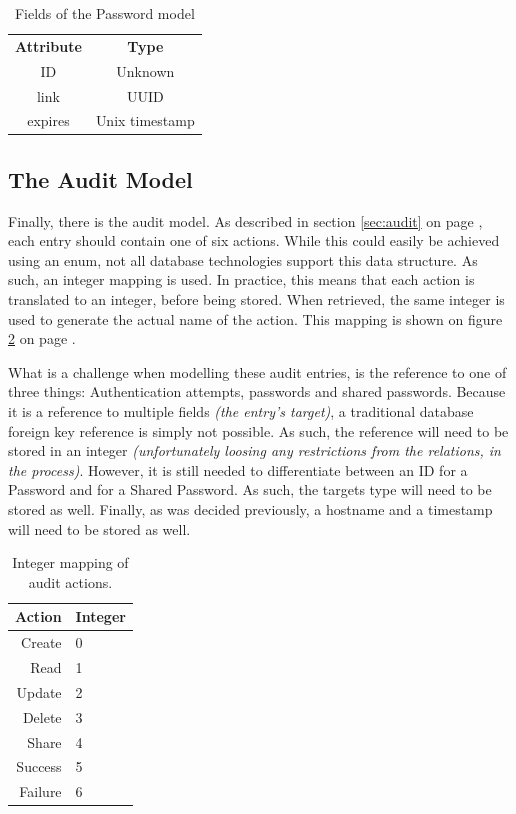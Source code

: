 			\begin{table}[p]
				\centering
				\begin{tabular}{c|c}
					\textbf{Attribute} 		& \textbf{Type} 		\\
					ID 						& Unknown 		\\
					link  					& UUID \\
					expires 				& Unix timestamp \\
				\end{tabular}
				\caption{Fields of the Password model}
				\label{fig:model:invite}
			\end{table}

		\subsection{The Audit Model}
			Finally, there is the audit model. As described in section \ref{sec:audit} on page \pageref{sec:audit}, each entry should contain one of six actions. While this could easily be achieved using an enum, not all database technologies support this data structure. As such, an integer mapping is used. In practice, this means that each action is translated to an integer, before being stored. When retrieved, the same integer is used to generate the actual name of the action. This mapping is shown on figure \ref{table:audit:actionmapping} on page \pageref{table:audit:actionmapping}.

			What is a challenge when modelling these audit entries, is the reference to one of three things: Authentication attempts, passwords and shared passwords. Because it is a reference to multiple fields \emph{(the entry's target)}, a traditional database foreign key reference is simply not possible. As such, the reference will need to be stored in an integer \emph{(unfortunately loosing any restrictions from the relations, in the process)}. However, it is still needed to differentiate between an ID for a Password and for a Shared Password. As such, the targets type will need to be stored as well. Finally, as was decided previously, a hostname and a timestamp will need to be stored as well.

			\begin{table}[h!]
				\centering
				\begin{tabular}{r | l}
					\textbf{Action} 	& \textbf{Integer} 	\\
					\hline
					Create 				& 0 				\\
					Read 				& 1 				\\
					Update 				& 2 				\\
					Delete 				& 3 				\\
					Share 				& 4 				\\
					Success 			& 5 				\\
					Failure 			& 6 				\\					
				\end{tabular}
				\caption{Integer mapping of audit actions.}
				\label{table:audit:actionmapping}
			\end{table}

